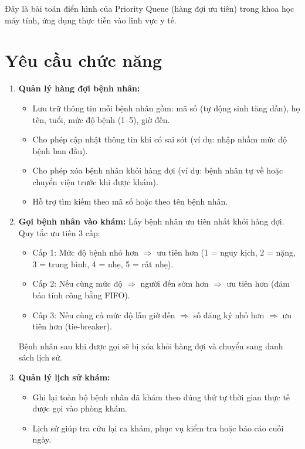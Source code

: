 \documentclass[12pt,a4paper]{report}
\begin{document}
Đây là bài toán điển hình của Priority Queue (hàng đợi ưu tiên) trong khoa
học máy tính, ứng dụng thực tiễn vào lĩnh vực y tế.

\section{Yêu cầu chức năng}

\begin{enumerate}
  \item \textbf{Quản lý hàng đợi bệnh nhân:}
        \begin{itemize}
          \item Lưu trữ thông tin mỗi bệnh nhân gồm: mã số (tự động sinh tăng
                dần), họ tên, tuổi, mức độ bệnh (1--5), giờ đến.
          \item Cho phép cập nhật thông tin khi có sai sót (ví dụ: nhập nhầm
                mức độ bệnh ban đầu).
          \item Cho phép xóa bệnh nhân khỏi hàng đợi (ví dụ: bệnh nhân tự về
                hoặc chuyển viện trước khi được khám).
          \item Hỗ trợ tìm kiếm theo mã số hoặc theo tên bệnh nhân.
        \end{itemize}

  \item \textbf{Gọi bệnh nhân vào khám:}
        Lấy bệnh nhân ưu tiên nhất khỏi hàng đợi. Quy tắc ưu tiên 3 cấp:
        \begin{itemize}
          \item Cấp 1: Mức độ bệnh nhỏ hơn $\Rightarrow$ ưu tiên hơn
                (1 = nguy kịch, 2 = nặng, 3 = trung bình, 4 = nhẹ,
                5 = rất nhẹ).
          \item Cấp 2: Nếu cùng mức độ $\Rightarrow$ người đến sớm hơn
                $\Rightarrow$ ưu tiên hơn (đảm bảo tính công bằng FIFO).
          \item Cấp 3: Nếu cùng cả mức độ lẫn giờ đến $\Rightarrow$ số đăng
                ký nhỏ hơn $\Rightarrow$ ưu tiên hơn (tie-breaker).
        \end{itemize}
        Bệnh nhân sau khi được gọi sẽ bị xóa khỏi hàng đợi và chuyển sang
        danh sách lịch sử.

  \item \textbf{Quản lý lịch sử khám:}
        \begin{itemize}
          \item Ghi lại toàn bộ bệnh nhân đã khám theo đúng thứ tự thời gian
                thực tế được gọi vào phòng khám.
          \item Lịch sử giúp tra cứu lại ca khám, phục vụ kiểm tra hoặc báo
                cáo cuối ngày.
        \end{itemize}


\end{enumerate}
\end{document}
